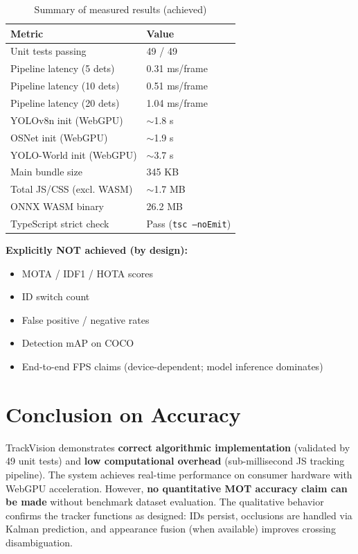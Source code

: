 \begin{table}[htbp]
\centering
\caption{Summary of measured results (achieved)}
\label{tab:results-summary}
\begin{tabular}{@{}ll@{}}
\toprule
\textbf{Metric} & \textbf{Value} \\
\midrule
Unit tests passing & 49 / 49 \\
Pipeline latency (5 dets) & 0.31 ms/frame \\
Pipeline latency (10 dets) & 0.51 ms/frame \\
Pipeline latency (20 dets) & 1.04 ms/frame \\
YOLOv8n init (WebGPU) & $\sim$1.8 s \\
OSNet init (WebGPU) & $\sim$1.9 s \\
YOLO-World init (WebGPU) & $\sim$3.7 s \\
Main bundle size & 345 KB \\
Total JS/CSS (excl. WASM) & $\sim$1.7 MB \\
ONNX WASM binary & 26.2 MB \\
TypeScript strict check & Pass (\texttt{tsc --noEmit}) \\
\bottomrule
\end{tabular}
\end{table}

\vspace{0.3cm}

\noindent \textbf{Explicitly NOT achieved (by design):}
\begin{itemize}
    \item MOTA / IDF1 / HOTA scores
    \item ID switch count
    \item False positive / negative rates
    \item Detection mAP on COCO
    \item End-to-end FPS claims (device-dependent; model inference dominates)
\end{itemize}

\section{Conclusion on Accuracy}
\label{sec:accuracy-conclusion}

TrackVision demonstrates \textbf{correct algorithmic implementation} (validated by 49 unit tests) and \textbf{low computational overhead} (sub-millisecond JS tracking pipeline). The system achieves real-time performance on consumer hardware with WebGPU acceleration. However, \textbf{no quantitative MOT accuracy claim can be made} without benchmark dataset evaluation. The qualitative behavior confirms the tracker functions as designed: IDs persist, occlusions are handled via Kalman prediction, and appearance fusion (when available) improves crossing disambiguation.